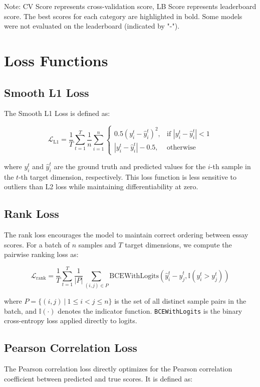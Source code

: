 \documentclass[12pt]{article}
\begin{document}
Note: CV Score represents cross-validation score, LB Score represents leaderboard score. The best scores for each category are highlighted in bold. Some models were not evaluated on the leaderboard (indicated by "-").

\section{Loss Functions}
\label{app:loss_functions}

\subsection{Smooth L1 Loss}
The Smooth L1 Loss is defined as:

\begin{equation}
    \mathcal{L}_{\text{L1}} = \frac{1}{T} \sum_{t=1}^T \frac{1}{n} \sum_{i=1}^n \begin{cases}
        0.5(y_i^t - \hat{y}_i^t)^2, & \text{if } |y_i^t - \hat{y}_i^t| < 1 \\
        |y_i^t - \hat{y}_i^t| - 0.5, & \text{otherwise}
    \end{cases}
\end{equation}

where $y_i^t$ and $\hat{y}_i^t$ are the ground truth and predicted values for the $i$-th sample in the $t$-th target dimension, respectively. This loss function is less sensitive to outliers than L2 loss while maintaining differentiability at zero.

\subsection{Rank Loss}
The rank loss encourages the model to maintain correct ordering between essay scores. For a batch of $n$ samples and $T$ target dimensions, we compute the pairwise ranking loss as:

\begin{equation}
    \mathcal{L}_{\text{rank}} = \frac{1}{T} \sum_{t=1}^T \frac{1}{|P|} \sum_{(i,j) \in P} \text{BCEWithLogits}\left(\hat{y}_i^t - \hat{y}_j^t, \mathbb{I}(y_i^t > y_j^t)\right)
\end{equation}

where $P = \{(i,j)\ |\ 1 \leq i < j \leq n\}$ is the set of all distinct sample pairs in the batch, and $\mathbb{I}(\cdot)$ denotes the indicator function. \texttt{BCEWithLogits} is the binary cross-entropy loss applied directly to logits.

\subsection{Pearson Correlation Loss}
The Pearson correlation loss directly optimizes for the Pearson correlation coefficient between predicted and true scores. It is defined as:
\end{document}
